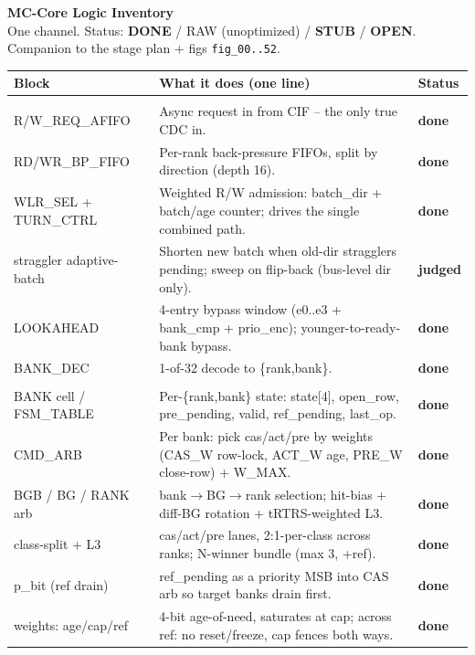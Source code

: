 \documentclass[10pt]{article}
\newcommand{\st}[1]{\textbf{\textcolor{done}{#1}}}
\newcommand{\op}[1]{\textbf{\textcolor{open}{#1}}}
\newcommand{\su}[1]{\textbf{\textcolor{stub}{#1}}}
\begin{document}
\begin{center}
{\Large\textbf{MC-Core Logic Inventory}}\\[2pt]
{\small One channel. Status: \st{DONE} / RAW (unoptimized) / \su{STUB} / \op{OPEN}.
Companion to the stage plan + figs \texttt{fig\_00..52}.}
\end{center}


{\footnotesize
\begin{longtable}{B P S}
\toprule
\textbf{Block} & \textbf{What it does (one line)} & \textbf{Status}\\
\midrule
\endhead

\\
\midrule
R/W\_REQ\_AFIFO      & Async request in from CIF -- the only true CDC in. & \st{done}\\
RD/WR\_BP\_FIFO      & Per-rank back-pressure FIFOs, split by direction (depth 16). & \st{done}\\
WLR\_SEL + TURN\_CTRL & Weighted R/W admission: batch\_dir + batch/age counter; drives the single combined path. & \st{done}\\
\quad straggler adaptive-batch & Shorten new batch when old-dir stragglers pending; sweep on flip-back (bus-level dir only). & \op{judged}\\
LOOKAHEAD           & 4-entry bypass window (e0..e3 + bank\_cmp + prio\_enc); younger-to-ready-bank bypass. & \st{done}\\
BANK\_DEC           & 1-of-32 decode to \{rank,bank\}. & \st{done}\\
\midrule

\\
\midrule
BANK cell / FSM\_TABLE & Per-\{rank,bank\} state: state[4], open\_row, pre\_pending, valid, ref\_pending, last\_op. & \st{done}\\
CMD\_ARB            & Per bank: pick cas/act/pre by weights (CAS\_W row-lock, ACT\_W age, PRE\_W close-row) + W\_MAX. & \st{done}\\
BGB / BG / RANK arb & bank$\to$BG$\to$rank selection; hit-bias + diff-BG rotation + tRTRS-weighted L3. & \st{done}\\
class-split + L3    & cas/act/pre lanes, 2:1-per-class across ranks; N-winner bundle (max 3, +ref). & \st{done}\\
p\_bit (ref drain)  & ref\_pending as a priority MSB into CAS arb so target banks drain first. & \st{done}\\
weights: age/cap/ref & 4-bit age-of-need, saturates at cap; across ref: no reset/freeze, cap fences both ways. & \st{done}\\
\midrule


\end{longtable}}
\end{document}
